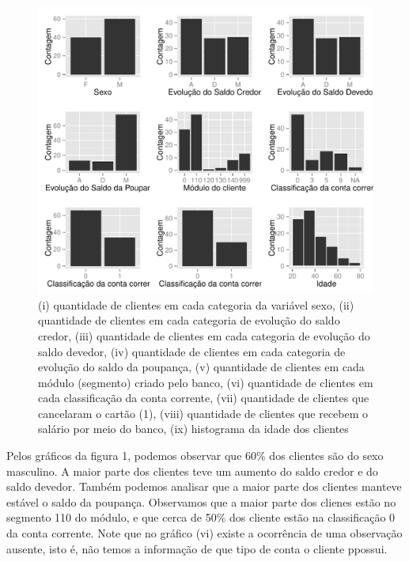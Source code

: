 \documentclass{article}\usepackage[]{graphicx}\usepackage[]{color}
\makeatletter
\def\maxwidth{ %
  \ifdim\Gin@nat@width>\linewidth
    \linewidth
  \else
    \Gin@nat@width
  \fi
}
\newenvironment{knitrout}{}{} %
\makeatother
\begin{document}
\begin{figure}
\centering
\begin{knitrout}
\color{fgcolor}
\includegraphics[width=\maxwidth]{figure/unnamed-chunk-2} 

\end{knitrout}
\caption{(i) quantidade de clientes em cada categoria da variável sexo, (ii) quantidade de clientes em cada categoria de evolução do saldo credor, (iii) quantidade de clientes em cada categoria de evolução do saldo devedor, (iv) quantidade de clientes em cada categoria de evolução do saldo da poupança, (v) quantidade de clientes em cada módulo (segmento) criado pelo banco, (vi) quantidade de clientes em  cada classificação da conta corrente, (vii) quantidade de clientes que cancelaram o cartão (1), (viii) quantidade de clientes que recebem o salário por meio do banco, (ix) histograma da idade dos clientes}
\end{figure}

Pelos gráficos da figura 1, podemos observar que 60\% dos clientes são do sexo masculino. A maior parte dos clientes teve um aumento do saldo credor e do saldo devedor. Também podemos analisar que a maior parte dos clientes manteve estável o saldo da poupança. Observamos que a maior parte dos clienes estão no segmento 110 do módulo, e que cerca de 50\% dos cliente estão na classificação 0 da conta corrente. Note que no gráfico (vi) existe a ocorrência de uma observação ausente, isto é, não temos a informação de que tipo de conta o cliente ppossui.
\end{document}
